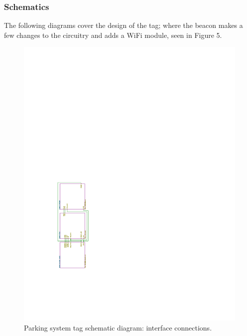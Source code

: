 \newpage
\subsubsection{Schematics}

The following diagrams cover the design of the tag; where the beacon makes a few changes to the circuitry and adds a WiFi module, seen in Figure 5.

\begin{figure}[H]
\begin{center}
\includegraphics[page=1,scale=1.5,trim={3cm 5cm 15cm 13cm},clip,angle=-90]{data/parking-system2.pdf}
\caption{Parking system tag schematic diagram: interface connections.}
\end{center}
\end{figure}

